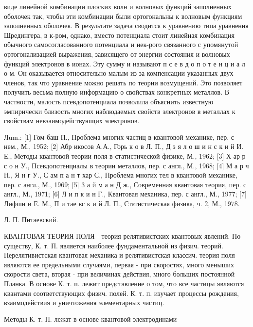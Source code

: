 \documentclass[10pt]{article}
\begin{document}
виде линейной комбинации плоских волн и волновых функций заполненных оболочек так, чтобы эти комбинации были ортогональны к волновым функциям заполненных оболочек. В результате задача сводится к уравнению типа уравнения Шредингера, в к-ром, однако, вместо потенциала стоит линейная комбинация обычного самосогласованного потенциала и нек-рого связанного с упомянутой ортогонализацией выражения, зависящего от энергии состояния и волновых функций электронов в ионах. Эту сумму и называют п с е в д о п о т е н ц и а л о м. Он оказывается относительно малым из-за компенсации указанных двух членов, так что уравнение можно решать по теории возмущений. Это позволяет получить весьма полную информацию о свойствах конкретных металлов. В частности, малость псевдопотенциала позволила объяснить известную эмпирически близость многих наблюдаемых свойств электронов в металлах к свойствам невзаимодействующих электронов.



Лum.: [1] Гом баш П., Проблема многих частиц в квантовой механике, пер. с нем., М., 1952; [2] Абр икосов А.А., Горь к о в Л. П., Д з я л о ш и н с к и й И. Е., Методы квантовой теории поля в статистической физике, М., 1962; [3] Х ар р с о н У., Псевдопотенциалы в теории металлов, пер. с англ., М., 1968; [4] М а р ч Н., Я н г У., С ам п а н т хар С., Проблема многих тел в квантовой механике, пер. с англ., М., 1969; [5] 3 а й м а н Д ж., Современная квантовая теория, пер. с англ., М., 1971; [6] Л и п к и н Г., Квантовая механика, пер. с англ., М., 1977; [7] Лифши и Е. М., П и тае вс к и й Л. П., Статистическая физика, ч. 2, М., 1978.



Л. П. Питаевский.



КВАНТОВАЯ ТЕОРИЯ ПОЛЯ - теория релятивистских квантовых явлений. По существу, К. т. П. является наиболее фундаментальной из физич. теорий. Нерелятивистская квантовая механика и релятивистская классич. теория поля являются ее предельными случаями, первая - при скоростях, много меныших скорости света, вторая - при величинах действия, много больших постоянной Планка. В основе К. т. п. лежит представление о том, что все частицы являются квантами соответствующих физич. полей. К. т. п. изучает процессы рождения, взаимодействия и уничтожения элементарных частиц.



Методы К. т. П. лежат в основе квантовой электродинами-
\end{document}
